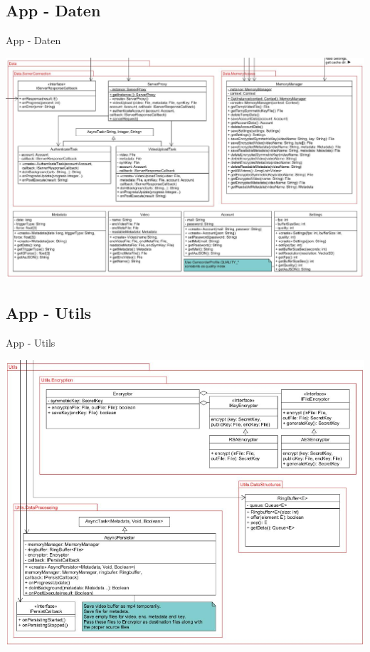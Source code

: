 \documentclass[19pt]{beamer}
\begin{document}
\subsection{App - Daten}
\begin{frame}{App - Daten}
\begin{center}
\includegraphics[scale=0.25]{resources/app_data.png}
\end{center}
\end{frame}
\subsection{App - Utils}
\begin{frame}{App - Utils}
\begin{center}
\includegraphics[scale=0.3]{resources/app_utils.png}
\end{center}
\end{frame}
\end{document}
